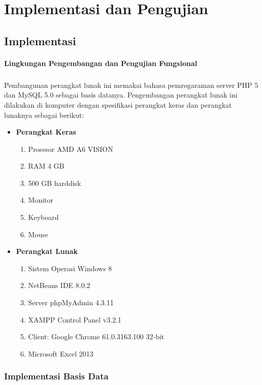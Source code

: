 \chapter{Implementasi dan Pengujian}
\label{chap:implementasiDanPengujian}
\setcounter{secnumdepth}{3}

\section{Implementasi}
\subsubsection{Lingkungan Pengembangan dan Pengujian Fungsional}
\paragraph{} Pembangunan perangkat lunak ini memakai bahasa pemrogaraman server PHP 5 dan MySQL 5.0 sebagai basis datanya. Pengembangan perangkat lunak ini dilakukan di komputer dengan spesifikasi perangkat keras dan perangkat lunaknya sebagai berikut:
\begin{itemize}
\item \textbf{Perangkat Keras}
\begin{enumerate}
	\item Prosesor AMD A6 VISION
	\item RAM 4 GB
	\item 500 GB harddisk
	\item Monitor
	\item Keyboard
	\item Mouse
\end{enumerate}
\item \textbf{Perangkat Lunak}
\begin{enumerate}
	\item Sistem Operasi Windows 8
	\item NetBeans IDE 8.0.2
	\item Server phpMyAdmin 4.3.11
	\item XAMPP Control Panel v3.2.1
	\item Client: Google Chrome 61.0.3163.100 32-bit
	\item Microsoft Excel 2013
\end{enumerate}

\end{itemize}
\subsection{Implementasi Basis Data}
